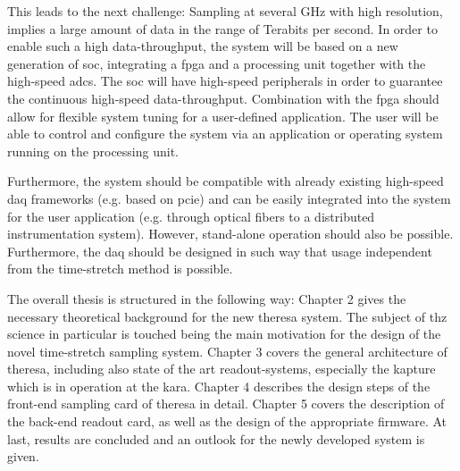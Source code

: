 This leads to the next challenge: Sampling at several \si{\GHz} with high resolution, implies a large amount of data in the range of Terabits per second. %
In order to enable such a high data-throughput, the system will be based on a new generation of \gls{soc}, integrating a \gls{fpga} and a processing unit together with the high-speed \glspl{adc}. 
The \gls{soc} will have high-speed peripherals in order to guarantee the continuous high-speed data-throughput. 
Combination with the \gls{fpga} should allow for flexible system tuning for a user-defined application.
The user will be able to control and configure the system via an application or operating system running on the processing unit.

Furthermore, the system should be compatible with already existing high-speed \gls{daq} frameworks (e.g. based on \gls{pcie}) and can be easily integrated into the system for the user application (e.g. through optical fibers to a distributed instrumentation system). %
However, stand-alone operation should also be possible.
Furthermore, the \gls{daq} should be designed in such way that usage independent from the time-stretch method is possible.


%

The overall thesis is structured in the following way: 
Chapter 2 gives the necessary theoretical background for the new \gls{theresa} system. 
The subject of \gls{thz} science in particular is touched being the main motivation for the design of the novel time-stretch sampling system.
Chapter 3 covers the general architecture of \gls{theresa}, including also state of the art readout-systems, especially the \gls{kapture} which is in operation at the \gls{kara}.
Chapter 4 describes the design steps of the front-end sampling card of \gls{theresa} in detail.
Chapter 5 covers the description of the back-end readout card, as well as the design of the appropriate firmware.
At last, results are concluded and an outlook for the newly developed system is given.


